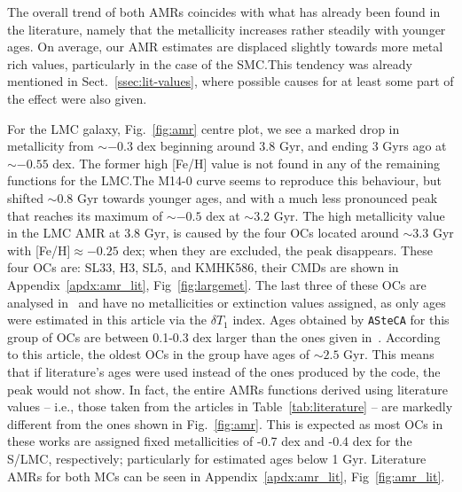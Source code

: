 \documentclass[a4paper,fleqn,usenatbib]{mnras}
\begin{document}
The overall trend of both AMRs coincides with what has already been found in the
literature, namely that the metallicity increases rather steadily with younger 
ages. On average, our AMR estimates are displaced slightly towards more metal
rich values, particularly in the case of the SMC.\@ This tendency was already
mentioned in Sect.~\ref{ssec:lit-values}, where possible causes for at least
some part of the effect were also given.

For the LMC galaxy, Fig.~\ref{fig:amr} centre plot, we see a marked
drop in metallicity from ${\sim-}0.3$ dex beginning around 3.8 Gyr, and
ending 3 Gyrs ago at ${\sim-}0.55$ dex. The former high [Fe/H] value is not
found in any of the remaining functions for the LMC.\@ The M14-0 curve seems to
reproduce this behaviour, but shifted ${\sim}0.8$ Gyr towards younger ages, and
with a much less pronounced peak that reaches its maximum of ${\sim-}0.5$ dex at
${\sim}3.2$ Gyr.
%
The high metallicity value in the LMC AMR at 3.8 Gyr, is caused by the four OCs
located around ${\sim}3.3$ Gyr with [Fe/H]${\approx-0.25}$ dex; when they are
excluded, the peak disappears.
These four OCs are: SL33, H3, SL5, and KMHK586, their CMDs are shown in
Appendix~\ref{apdx:amr_lit}, Fig~\ref{fig:largemet}.
The last three of these OCs are analysed in~\citet{Piatti_2011b} and have no
metallicities or extinction values assigned,
as only ages were estimated in this article via the $\delta T_1$ index.
Ages obtained by \texttt{ASteCA} for this group of OCs are between 0.1-0.3 dex
larger than the ones given in~\citet{Piatti_2011b}.
According to this article, the oldest OCs in the group have ages of ${\sim}2.5$
Gyr. This means that if literature's ages were used instead of the ones produced
by the code, the peak would not show.
In fact, the entire AMRs functions derived using literature values -- i.e.,
those taken from the articles in Table~\ref{tab:literature} -- are markedly
different from the ones shown in Fig.~\ref{fig:amr}.
This is expected as most OCs in these works are assigned fixed metallicities of
-0.7 dex and -0.4 dex for the S/LMC, respectively; particularly for estimated
ages below 1 Gyr. Literature AMRs for both MCs can be seen in
Appendix~\ref{apdx:amr_lit}, Fig~\ref{fig:amr_lit}.

\end{document}
